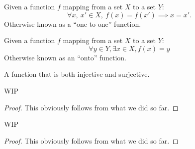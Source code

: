 \begin{definition}[Injective]
    \label{definition : injective}
    \leanok
    Given a function \( f \) mapping from a set \( X \) to a set \( Y \):
    \[
        \forall x,~ x' \in X,~ f(x) = f(x') \implies x = x'.
    \]
    Otherwise known as a ``one-to-one'' function.
\end{definition}

\begin{definition}[Surjective]
    \label{definition : surjective}
    \leanok
    Given a function \( f \) mapping from a set \( X \) to a set \( Y \):
    \[
        \forall y \in Y, \exists x \in X, f(x) = y
    \]
    Otherwise known as an ``onto'' function.
\end{definition}

\begin{definition}[Bijective]
    \label{definition : bijective}
    \leanok
    A function that is both injective and surjective.
\end{definition}

\begin{theorem}
    \label{theorem : surjective_comp}
    \leanok
    WIP
\end{theorem}

\begin{proof}
    \leanok
    \uses{}
    This obviously follows from what we did so far.
\end{proof}

\begin{theorem}
    \label{theorem : bijective_comp}
    \leanok
    WIP
\end{theorem}

\begin{proof}
    \leanok
    \uses{}
    This obviously follows from what we did so far.
\end{proof}

